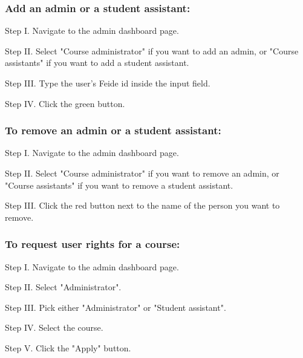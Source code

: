 \subsubsection{Add an admin or a student assistant:}
\begin{userManualItemlist}
    \item[Step I.] Navigate to the admin dashboard page.
    \item[Step II.] Select "Course administrator" if you want to add an admin, or "Course assistants" if you want to add a student assistant.
    \item[Step III.] Type the user's Feide id inside the input field.
    \item[Step IV.] Click the green button.   
\end{userManualItemlist}

\subsubsection{To remove an admin or a student assistant:}
\begin{userManualItemlist}
    \item[Step I.] Navigate to the admin dashboard page.
    \item[Step II.] Select "Course administrator" if you want to remove an admin, or "Course assistants" if you want to remove a student assistant.
    \item[Step III.] Click the red button next to the name of the person you want to remove.
\end{userManualItemlist}

\subsubsection{To request user rights for a course:}
\begin{userManualItemlist}
    \item[Step I.] Navigate to the admin dashboard page.
    \item[Step II.] Select "Administrator".
    \item[Step III.] Pick either "Administrator" or "Student assistant".
    \item[Step IV.] Select the course.
    \item[Step V.] Click the "Apply" button.   
\end{userManualItemlist}

